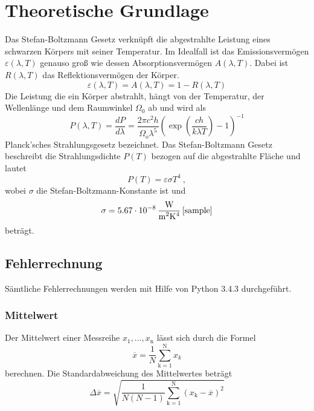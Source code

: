 \section{Theoretische Grundlage}
\label{sec:Theorie}
Das Stefan-Boltzmann Gesetz verknüpft die abgestrahlte Leistung eines schwarzen Körpers mit seiner Temperatur. Im Idealfall ist das Emissionsvermögen $\varepsilon(\lambda, T)$ genauso groß wie dessen Absorptionsvermögen $A(\lambda, T)$. Dabei ist $R(\lambda,T)$ das Reflektionsvermögen der Körper.
\begin{equation}
  \varepsilon(\lambda, T) = A(\lambda, T) = 1-R(\lambda, T)
  \label{eqn:emission}
\end{equation}
Die Leistung die ein Körper abstrahlt, hängt von der Temperatur, der Wellenlänge und dem Raumwinkel $\Omega_0$ ab und wird als
\begin{equation}
  P(\lambda, T) = \frac{dP}{d \lambda} = \frac{2 \pi c^2 h}{\Omega_o \lambda^5}\left( \exp \left( \frac{c h}{k \lambda T} \right) -1 \right)^{-1}
  \label{eqn:planck}
\end{equation}
Planck'sches Strahlungsgesetz bezeichnet.
Das Stefan-Boltzmann Gesetz beschreibt die Strahlungsdichte $P(T)$ bezogen auf die abgestrahlte Fläche und lautet
\begin{equation}
  P(T) = \varepsilon \sigma T^4 \ ,
  \label{eqn:strahlungsgesetz}
\end{equation}
wobei $\sigma$ die Stefan-Boltzmann-Konstante ist und
\begin{equation}
  \sigma = 5.67 \cdot 10^{-8} \, \frac{\text{W}}{\text{m$^2$K$^4$}} \, \text{\cite{sample}}
\end{equation}
beträgt.
\subsection{Fehlerrechnung}
Sämtliche Fehlerrechnungen werden mit Hilfe von Python 3.4.3 durchgeführt.
\subsubsection{Mittelwert}
Der Mittelwert einer Messreihe $x_\text{1}, ... ,x_\text{n}$ lässt sich durch die Formel
\begin{equation}
	\overline{x} = \frac{1}{N} \sum_{\text{k}=1}^\text{N} x_k
	\label{eqn:ave}
\end{equation}
berechnen. Die Standardabweichung des Mittelwertes beträgt
\begin{equation}
	\Delta \overline{x} = \sqrt{ \frac{1}{N(N-1)} \sum_{\text{k}=1}^\text{N} (x_\text{k} - \overline{x})^2}
	\label{eqn:std}
\end{equation}
